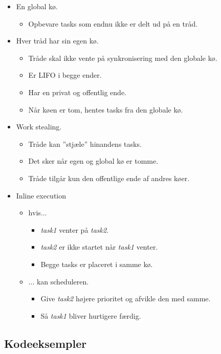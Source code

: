 \begin{itemize}
	\item En global kø.
	\begin{itemize}
		\item Opbevare tasks som endnu ikke er delt ud på en tråd.
	\end{itemize}
	\item Hver tråd har sin egen kø.
	\begin{itemize}
		\item Tråde skal ikke vente på synkronisering med den globale kø.
		\item Er LIFO i begge ender.
		\item Har en privat og offentlig ende.
		\item Når køen er tom, hentes tasks fra den globale kø.
	\end{itemize}
	\item Work stealing.
	\begin{itemize}
		\item Tråde kan ''stjæle'' hinandens tasks.
		\item Det sker når egen og global kø er tomme.
		\item Tråde tilgår kun den offentlige ende af andres køer.
	\end{itemize}
	\item Inline execution
	\begin{itemize}
		\item hvis...
		\begin{itemize}
			\item \textit{task1} venter på \textit{task2}.
			\item \textit{task2} er ikke startet når \textit{task1} venter.
			\item Begge tasks er placeret i samme kø.
		\end{itemize}
		\item ... kan scheduleren.
		\begin{itemize}
			\item Give \textit{task2} højere prioritet og afvikle den med samme.
			\item Så \textit{task1} bliver hurtigere færdig.
		\end{itemize}
	\end{itemize}
\end{itemize}

\subsection{Kodeeksempler}

